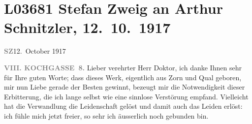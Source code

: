 

\section[Stefan Zweig an Arthur Schnitzler, 12. 10. 1917]{L03681 Stefan Zweig an Arthur Schnitzler, 12. 10. 1917}
\nopagebreak{}
\rehead{ }\normalsize\beginnumbering{}
\toendnotes[C]{\smallbreak\pagebreak[2]}
\toendnotes[C]{\smallbreak}
\pstart
           {\pb}\textcolor{gray}{\textbf{SZ}}\hfill 12. October 1917\pend
           
\pstart
           \raggedleft{}\textcolor{gray}{\textbf{VIII. KOCHGASSE 8.}}\pend
           \vspace{0.5em}
\pstart
           Lieber verehrter Herr Doktor, ich danke Ihnen sehr für Ihre guten
               Worte; dass dieses Werk, eigentlich aus
               Zorn und Qual geboren, mir nun Liebe gerade der Besten gewinnt, bezeugt mir die
               Notwendigkeit dieser Erbitterung, die ich lange selbst wie eine sinnlose Verstörung
               empfand. Vielleicht hat die Verwandlung die Leidenschaft gelöst und damit auch das
               Leiden erlöst: ich fühle mich jetzt freier, so sehr ich äusserlich noch gebunden
               bin.\pend
           
